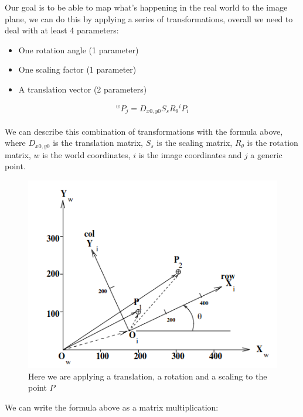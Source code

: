Our goal is to be able to map what's happening in the real world to the image plane, we can do this by applying a series of transformations, overall we need to deal with at least 4 parameters:
\begin{itemize} 
    \item One rotation angle (1 parameter)
    \item One scaling factor (1 parameter)
    \item A translation vector (2 parameters)
\end{itemize}

\[{}^w P_j = D_{x0,y0} S_s R_\theta {}^i P_i\]
\\
We can describe this combination of transformations with the formula above, where \(D_{x0,y0}\) is the translation matrix, \(S_s\) is the scaling matrix, \(R_\theta\) is the rotation matrix, \(w\) is the world coordinates, \(i\) is the image coordinates and \(j\) a generic point.

\begin{figure}[H]
    \centering
    \includegraphics[scale = 0.6]{Figures/comb.png}
    \caption{Here we are applying a translation, a rotation and a scaling to the point \(P\)}
    \label{fig:comb}
\end{figure}

We can write the formula above as a matrix multiplication:

